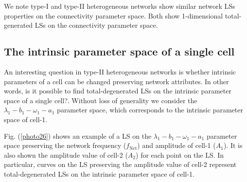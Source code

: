 We note type-\textrm{I} and type-\textrm{II} heterogeneous networks show similar network LSs properties on the connectivity parameter space. Both show 1-dimensional total-generated LSs on the connectivity parameter space.

\subsection{The intrinsic parameter space of a single cell}
An interesting question in type-\textrm{II} heterogeneous networks is whether intrinsic parameters of a cell can be changed preserving network attributes. In other words, is it possible to find total-degenerated LSs on the intrinsic parameter space of a single cell?. Without loss of generality we consider the $\lambda_{1}-b_{1}-\omega_{1}-a_{1}$ parameter space, which corresponds to the intrinsic parameter space of cell-1.

Fig. (\ref{photo26}) shows an example of a LS on the  $\lambda_{1}-b_{1}-\omega_{1}-a_{1}$ parameter space preserving the network frequency ($f_{\text{Net}}$) and amplitude of cell-1 ($A_{1}$). It is also shown the amplitude value of cell-2 ($A_{2}$) for each point on the LS. In particular, curves on the LS preserving the amplitude value of cell-2 represent total-degenerated LSs on the intrinsic parameter space of cell-1.

